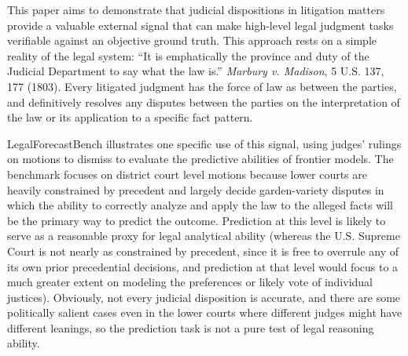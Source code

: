 \documentclass[11pt]{article}
\begin{document}
This paper aims to demonstrate that judicial dispositions in litigation matters provide a valuable external signal that can make high-level legal judgment tasks verifiable against an objective ground truth. This approach rests on a simple reality of the legal system: ``It is emphatically the province and duty of the Judicial Department to say what the law is.'' \emph{Marbury v. Madison}, 5 U.S. 137, 177 (1803). Every litigated judgment has the force of law as between the parties, and definitively resolves any disputes between the parties on the interpretation of the law or its application to a specific fact pattern.

LegalForecastBench illustrates one specific use of this signal, using judges' rulings on motions to dismiss to evaluate the predictive abilities of frontier models. The benchmark focuses on district court level motions because lower courts are heavily constrained by precedent and largely decide garden-variety disputes in which the ability to correctly analyze and apply the law to the alleged facts will be the primary way to predict the outcome. Prediction at this level is likely to serve as a reasonable proxy for legal analytical ability (whereas the U.S. Supreme Court is not nearly as constrained by precedent, since it is free to overrule any of its own prior precedential decisions, and prediction at that level would focus to a much greater extent on modeling the preferences or likely vote of individual justices). Obviously, not every judicial disposition is accurate, and there are some politically salient cases even in the lower courts where different judges might have different leanings, so the prediction task is not a pure test of legal reasoning ability.
\end{document}
